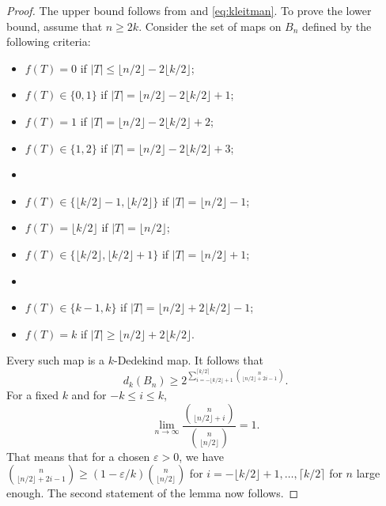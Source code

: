 \documentclass[12pt]{amsart}
\numberwithin{equation}{section}
\theoremstyle{definition}
\newcommand{\floor}[1]{\lfloor {#1} \rfloor}
\newcommand{\ceiling}[1]{\lceil {#1} \rceil}
\begin{document}
\begin{proof}
 The upper bound follows from  and \eqref{eq:kleitman}. To prove the lower bound,  assume that $n \geq 2k$. Consider the set
of maps on $B_{n}$ defined by the following criteria:
%
 \begin{itemize}
  \item $f(T) = 0$ if $|T| \leq \floor{n/2} - 2 \floor{k/2}$;
  \item $f(T) \in \{0,1\}$ if $|T| = \floor{n/2} - 2 \floor{k/2} + 1$;
  \item $f(T) = 1$ if $|T| = \floor{n/2} - 2 \floor{k/2} + 2$;
  \item $f(T) \in \{1,2\}$ if $|T| = \floor{n/2} - 2 \floor{k/2} + 3$;
  \item[$\vdots$]
  \item $f(T) \in \{\floor{k/2}-1,\floor{k/2}\}$ if $|T| = \floor{n/2} - 1$;
  \item $f(T) = \floor{k/2}$ if $|T| = \floor{n/2}$;
  \item $f(T) \in \{\floor{k/2},\floor{k/2}+1\}$ if $|T| = \floor{n/2} + 1$;
  \item[$\vdots$]
  \item $f(T) \in \{k-1,k\}$ if $|T| = \floor{n/2} + 2 \floor{k/2} - 1$;
  \item $f(T) = k$ if $|T| \geq \floor{n/2} + 2 \floor{k/2}$.
 \end{itemize}
 Every such map is a $k$-Dedekind map. It follows that
 $$d_k(B_n) \geq 2^{\sum_{i=-\floor{k/2}+1}^{\ceiling{k/2}} \binom{n}{\floor{n/2}+2i-1}}.$$
 For a fixed $k$ and for $-k \leq i \leq k$,
 $$\lim_{n \to \infty} \frac{\binom{n}{\floor{n/2}+i}}{\binom{n}{\floor{n/2}}} = 1.$$
 That means that for a chosen $\varepsilon > 0$, we have $\binom{n}{\floor{n/2}+2i-1} \geq (1-\varepsilon/k) \binom{n}{\floor{n/2}}$ for $i=-\floor{k/2}+1,\ldots,\ceiling{k/2}$ for $n$ large enough. The second statement of the lemma now follows.
\end{proof}
\end{document}

